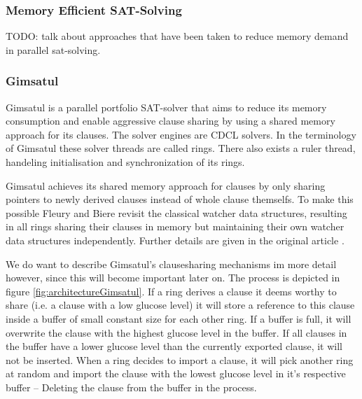 \documentclass[12pt,a4paper,twoside]{scrartcl}
\numberwithin{equation}{section}
\begin{document}
\subsubsection{Memory Efficient SAT-Solving}

TODO: talk about approaches that have been taken to reduce memory demand in parallel sat-solving.

\subsubsection{Gimsatul}

Gimsatul \cite{gimsatul} is a parallel portfolio SAT-solver that aims to reduce its memory consumption and enable aggressive clause sharing by using a shared memory approach for its clauses. The solver engines are CDCL solvers. In the terminology of Gimsatul these solver threads are called rings. There also exists a ruler thread, handeling initialisation and synchronization of its rings.

Gimsatul achieves its shared memory approach for clauses by only sharing pointers to newly derived clauses instead of whole clause themselfs. To make this possible Fleury and Biere revisit the classical watcher data structures, resulting in all rings sharing their clauses in memory but maintaining their own watcher data structures independently. Further details are given in the original article \cite{gimsatul}.

We do want to describe Gimsatul's clausesharing mechanisms im more detail however, since this will become important later on. The process is depicted in figure \ref{fig:architectureGimsatul}. If a ring derives a clause it deems worthy to share (i.e. a clause with a low glucose level) it will store a reference to this clause inside a buffer of small constant size for each other ring. If a buffer is full, it will overwrite the clause with the highest glucose level in the buffer. If all clauses in the buffer have a lower glucose level than the currently exported clause, it will not be inserted. When a ring decides to import a clause, it will pick another ring at random and import the clause with the lowest glucose level in it's respective buffer -- Deleting the clause from the buffer in the process.
\end{document}
